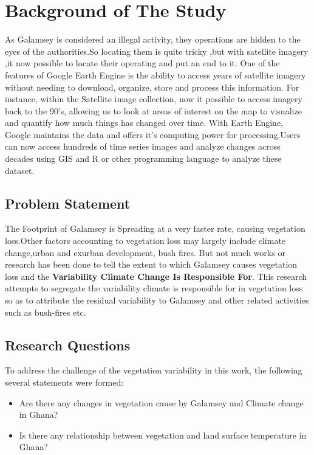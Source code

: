 \documentclass[12pt,a4paper]{book}
\begin{document}
{{\section{Background of The Study}\label{background-of-the-study}}

As Galamsey is considered an illegal activity, they operations are
hidden to the eyes of the authorities.So locating them is quite tricky
,but with satellite imagery ,it now possible to locate their operating
and put an end to it. One of the features of Google Earth Engine is the
ability to access years of satellite imagery without needing to
download, organize, store and process this information. For instance,
within the Satellite image collection, now it possible to access imagery
back to the 90's, allowing us to look at areas of interest on the map to
visualize and quantify how much things has changed over time. With Earth
Engine, Google maintains the data and offers it's computing power for
processing.Users can now access hundreds of time series images and
analyze changes across decades using GIS and R or other programming
language to analyze these dataset.

\hypertarget{problem-statement}{%
\subsection{Problem Statement}\label{problem-statement}}

The Footprint of Galamsey is Spreading at a very faster rate, causing
vegetation loss.Other factors accounting to vegetation loss may largely
include climate change,urban and exurban development, bush fires. But
not much works or research has been done to tell the extent to which
Galamsey causes vegetation loss and the \textbf{Variability Climate
Change Is Responsible For}. This research attempts to segregate the
variability climate is responsible for in vegetation loss so as to
attribute the residual variability to Galamsey and other related
activities such as bush-fires etc.

\hypertarget{research-questions}{%
\subsection{Research Questions}\label{research-questions}}

To address the challenge of the vegetation variability in this work, the
following several statements were formed:

\begin{itemize}
\item
  Are there any changes in vegetation cause by Galamsey and Climate
  change in Ghana?
\item
  Is there any relationship between vegetation and land surface
  temperature in Ghana?
\end{itemize}

}
\end{document}
